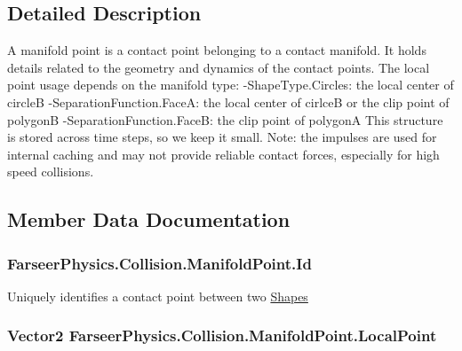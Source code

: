 \subsection{Detailed Description}
A manifold point is a contact point belonging to a contact manifold. It holds details related to the geometry and dynamics of the contact points. The local point usage depends on the manifold type\+: -\/\+Shape\+Type.\+Circles\+: the local center of circle\+B -\/\+Separation\+Function.\+Face\+A\+: the local center of cirlce\+B or the clip point of polygon\+B -\/\+Separation\+Function.\+Face\+B\+: the clip point of polygon\+A This structure is stored across time steps, so we keep it small. Note\+: the impulses are used for internal caching and may not provide reliable contact forces, especially for high speed collisions. 



\subsection{Member Data Documentation}
\hypertarget{struct_farseer_physics_1_1_collision_1_1_manifold_point_ad77bd7009070038f52c49f35440bbd4d}{
\subsubsection[{Id}]{ Farseer\+Physics.\+Collision.\+Manifold\+Point.\+Id}}\label{struct_farseer_physics_1_1_collision_1_1_manifold_point_ad77bd7009070038f52c49f35440bbd4d}


Uniquely identifies a contact point between two \hyperlink{namespace_farseer_physics_1_1_collision_1_1_shapes}{Shapes} 

\hypertarget{struct_farseer_physics_1_1_collision_1_1_manifold_point_a258a7ac06bb64e7341ccda001f60fc24}{
\subsubsection[{Local\+Point}]{\setlength{\rightskip}{0pt plus 5cm}Vector2 Farseer\+Physics.\+Collision.\+Manifold\+Point.\+Local\+Point}}\label{struct_farseer_physics_1_1_collision_1_1_manifold_point_a258a7ac06bb64e7341ccda001f60fc24}


